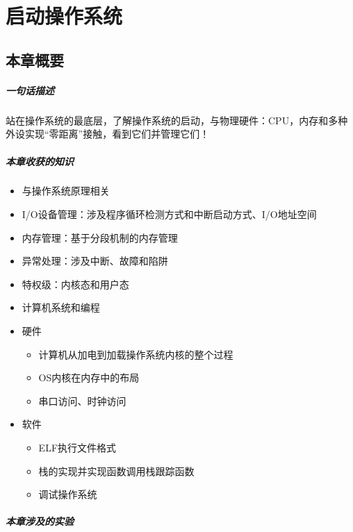 \chapter{启动操作系统}\label{ch_boot}

\section{本章概要}

\paragraph{一句话描述}
站在操作系统的最底层，了解操作系统的启动，与物理硬件：CPU，内存和多种外设实现“零距离”接触，看到它们并管理它们！

\paragraph{本章收获的知识}

\begin{itemize}
	\item
	与操作系统原理相关
	\item
	I/O设备管理：涉及程序循环检测方式和中断启动方式、I/O地址空间
	\item
	内存管理：基于分段机制的内存管理
	\item
	异常处理：涉及中断、故障和陷阱
	\item
	特权级：内核态和用户态
	\item
	计算机系统和编程
	\item
	硬件	
	\begin{itemize}
		\item
		计算机从加电到加载操作系统内核的整个过程
		\item
		OS内核在内存中的布局
		\item
		串口访问、时钟访问
	\end{itemize}
	\item
	软件	
	\begin{itemize}
		\item
		ELF执行文件格式
		\item
		栈的实现并实现函数调用栈跟踪函数
		\item
		调试操作系统
	\end{itemize}
\end{itemize}

\paragraph{本章涉及的实验}

